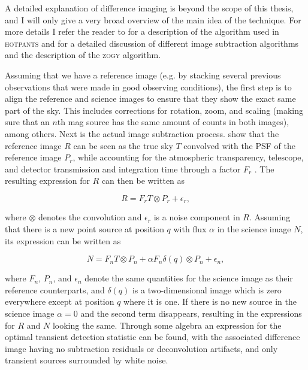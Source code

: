 \documentclass[a4paper,oneside,12pt, class=Latex/Classes/PhDthesisPSnPDF, crop=false]{standalone}
\begin{document}
A detailed explanation of difference imaging is beyond the scope of this thesis, and I will only give a very broad overview of the main idea of the technique. For more details I refer the reader to \citet{HOTPANTS_algorithm_source} for a description of the algorithm used in \textsc{hotpants} and \citet{ZOGY} for a detailed discussion of different image subtraction algorithms and the description of the \textsc{zogy} algorithm. 

Assuming that we have a reference image (e.g. by stacking several previous observations that were made in good observing conditions), the first step is to align the reference and science images to ensure that they show the exact same part of the sky. This includes corrections for rotation, zoom, and scaling (making sure that an $n$th mag source has the same amount of counts in both images), among others. Next is the actual image subtraction process. \citet{ZOGY} show that the reference image $R$ can be seen as the true sky $T$ convolved with the PSF of the reference image $P_r$, while accounting for the atmospheric transparency, telescope, and detector transmission and integration time through a factor $F_r$ \citep{Stacking_I, Stacking_II}. The resulting expression for $R$ can then be written as

\begin{equation}
    R = F_rT\otimes P_r + \epsilon_r,
\end{equation}

where $\otimes$ denotes the convolution and $\epsilon_r$ is a noise component in $R$. Assuming that there is a new point source at position $q$ with flux $\alpha$ in the science image $N$, its expression can be written as

\begin{equation}
    N = F_nT\otimes P_n + \alpha F_n\delta(q)\otimes P_n + \epsilon_n,
\end{equation}

where $F_n$, $P_n$, and $\epsilon_n$ denote the same quantities for the science image as their reference counterparts, and $\delta(q)$ is a two-dimensional image which is zero everywhere except at position $q$ where it is one. If there is no new source in the science image $\alpha=0$ and the second term disappears, resulting in the expressions for $R$ and $N$ looking the same. Through some algebra an expression for the optimal transient detection statistic can be found, with the associated difference image having no subtraction residuals or deconvolution artifacts, and only transient sources surrounded by white noise.
\end{document}
